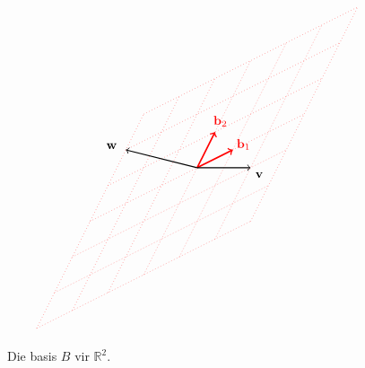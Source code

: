 \documentclass[a4paper,11pt]{book}
\theoremstyle{definition}
\newcommand{\ve}[1]{\mathbf{#1}}
\begin{document}
\begin{figure}
	\[
		\begin{tikzpicture}[scale=0.5]
			\draw[red, dotted] (-9, -9) -- (3, -3);
			\draw[red, dotted] (-8, -7) -- (4, -1);
			\draw[red, dotted] (-7, -5) -- (5, 1);
			\draw[red, dotted] (-6, -3) -- (6, 3);
			\draw[red, dotted] (-5, -1) -- (7, 5);
			\draw[red, dotted] (-4, 1) -- (8, 7);
			\draw[red, dotted] (-3, 3) -- (9, 9);

			\draw[red, dotted] (-9, -9) -- (-3, 3);
			\draw[red, dotted] (-7, -8) -- (-1, 4);
			\draw[red, dotted] (-5, -7) -- (1, 5);
			\draw[red, dotted] (-3, -6) -- (3, 6);
			\draw[red, dotted] (-1, -5) -- (5, 7);
			\draw[red, dotted] (1, -4) -- (7, 8);
			\draw[red, dotted] (3, -3) -- (9, 9);


			\draw[very thick, red, ->] (0,0) -- node[pos=1.3] {$\ve{b}_1$}
			(2,1);
			\draw[very thick, red, ->] (0,0) -- node[pos=1.3] {$\ve{b}_2$}
			(1,2);
			\draw[thick, ->] (0,0) -- (3,0) node[below right] {$\ve{v}$};
			\draw[thick, ->] (0,0) -- node[pos=1.2] {$\ve{w}$} (-4,1); 
		\end{tikzpicture}
	\]
	\caption{\label{v_and_w_in_basis_B}
	Die basis $B$ vir $\mathbb{R}^2$.}
\end{figure}
\end{document}
